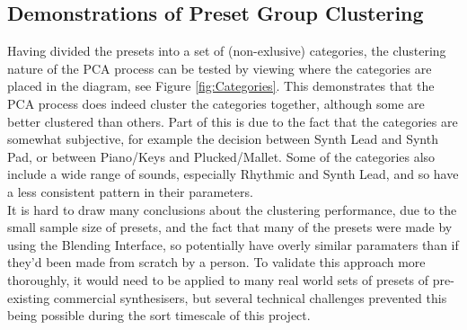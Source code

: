 \documentclass[11pt, oneside]{report}   	%
\begin{document}
\subsection{Demonstrations of Preset Group Clustering}
Having divided the presets into a set of (non-exlusive) categories, the clustering nature of the PCA process can be tested by viewing where the categories are placed in the diagram, see Figure \ref{fig:Categories}. This demonstrates that the PCA process does indeed cluster the categories together, although some are better clustered than others. Part of this is due to the fact that the categories are somewhat subjective, for example the decision between Synth Lead and Synth Pad, or between Piano/Keys and Plucked/Mallet. Some of the categories also include a wide range of sounds, especially Rhythmic and Synth Lead, and so have a less consistent pattern in their parameters.\\
It is hard to draw many conclusions about the clustering performance, due to the small sample size of presets, and the fact that many of the presets were made by using the Blending Interface, so potentially have overly similar paramaters than if they'd been made from scratch by a person. To validate this approach more thoroughly, it would need to be applied to many real world sets of presets of pre-existing commercial synthesisers, but several technical challenges prevented this being possible during the sort timescale of this project.
\end{document}
